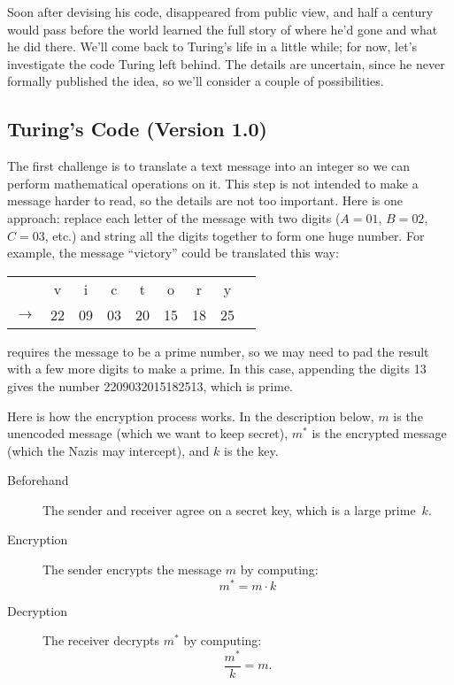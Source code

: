Soon after devising his code,  disappeared from public view, and half a century
would pass before the world learned the full story of where he'd gone and what he did
there.  We'll come back to Turing's life in a little while; for now, let's investigate the
code Turing left behind.  The details are uncertain, since he never formally published the
idea, so we'll consider a couple of possibilities.

\subsection{Turing's Code (Version 1.0)}

The first challenge is to translate a text message into an integer so we can perform
mathematical operations on it.  This step is not intended to make a message harder to read,
so the details are not too important.  Here is one approach: replace each letter of the
message with two digits ($A = 01$, $B = 02$, $C = 03$, etc.) and string all the digits
together to form one huge number.  For example, the message ``victory'' could be translated
this way:
\begin{center}
\begin{tabular}{ccccccccc}
   &v & i & c & t & o & r & y \\ $\rightarrow$ & 22 & 09 & 03 & 20 & 15 & 18 & 25
\end{tabular}
\end{center}
 requires the message to be a prime number, so we may need to pad the
result with a few more digits to make a prime.  In this case, appending the digits 13 gives
the number 2209032015182513, which is prime.

Here is how the encryption process works.  In the description below, $m$ is the unencoded
message (which we want to keep secret), $m^*$ is the encrypted message (which the Nazis may
intercept), and $k$ is the key.

\begin{description}

\item[Beforehand] The sender and receiver agree on a secret key, which is a large
  prime~$k$.

\item[Encryption] The sender encrypts the message $m$ by computing:
\[
m^* = m \cdot k
\]

\item[Decryption] The receiver decrypts $m^*$ by computing:
\[
\frac{m^*}{k} \iffalse = \frac{m \cdot k}{k} \fi = m.
\]

\end{description}

